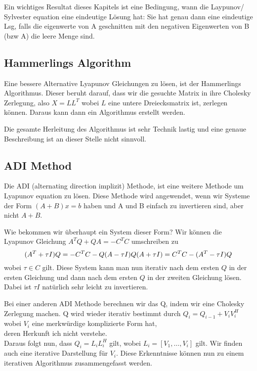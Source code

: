 \documentclass[]{article}
\begin{document}
Ein wichtiges Resultat dieses Kapitels ist eine Bedingung, wann die Laypunov/ Sylvester equation eine eindeutige Lösung hat: Sie hat genau dann eine eindeutige Lsg, falls die eigenwerte von A geschnitten mit den negativen Eigenwerten von B (bzw A) die leere Menge sind. 

\subsection{Hammerlings Algorithm}
Eine bessere Alternative Lyapunov Gleichungen zu lösen, ist der Hammerlings Algorithmus. Dieser beruht darauf, dass wir die gesuchte Matrix in ihre Cholesky Zerlegung, also $X=LL^T$ wobei $L$ eine untere Dreiecksmatrix ist, zerlegen können. Daraus kann dann ein Algorithmus erstellt werden. 

Die gesamte Herleitung des Algorithmus ist sehr Technik lastig und eine genaue Beschreibung ist an dieser Stelle nicht sinnvoll. 

\subsection{ADI Method}
Die ADI (alternating direction implizit) Methode, ist eine weitere Methode um Lyapunov equation zu lösen. Diese Methode wird angewendet, wenn wir Systeme der Form $(A+B)x=b$ haben und A und B einfach zu invertieren sind, aber nicht $A+B$. 

Wie bekommen wir überhaupt ein System dieser Form? Wir können die Lyapunov Gleichung $ A^TQ+QA=-C^TC$ umschreiben zu 
\begin{equation*}
	(A^T+ \tau I)Q=-C^TC - Q(A-\tau I) \\
	Q(A+\tau I) = C^TC-(A^T-\tau I)Q
\end{equation*}
wobei $\tau \in C$ gilt.
Diese System kann man nun iterativ nach dem ersten $Q$ in der ersten Gleichung und dann nach dem ersten $Q$ in der zweiten Gleichung lösen. Dabei ist $\tau I$ natürlich sehr leicht zu invertieren. 

Bei einer anderen ADI Methode berechnen wir das Q, indem wir eine Cholesky Zerlegung machen. Q wird wieder iterativ bestimmt durch $Q_i=Q_{i-1} + V_i V_i^H$ wobei $V_i$ eine merkwürdige komplizierte Form hat, \\

 deren Herkunft ich nicht verstehe. \\
 
 Daraus folgt nun, dass $Q_i=L_i L_i^H$ gilt, wobei $L_i=[V_1, \dots, V_i ]$ gilt. Wir finden auch eine iterative Darstellung für $V_i$.  
Diese Erkenntnisse können nun zu einem iterativen Algorithmus zusammengefasst werden. 
\end{document}

